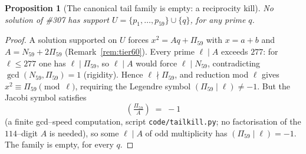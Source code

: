 \documentclass[11pt]{article}
\newtheorem{proposition}[theorem]{Proposition}
\theoremstyle{definition}
\begin{document}
\begin{proposition}[The canonical tail family is empty: a reciprocity kill]\label{prop:tailkill}
No solution of \#307 has support $U=\{p_1,\dots,p_{59}\}\cup\{q\}$, for any prime $q$.
\end{proposition}
\begin{proof}
A solution supported on $U$ forces $x^2=Aq+\Pi_{59}$ with $x=a+b$ and $A=N_{59}+2\Pi_{59}$
(Remark~\ref{rem:tier60}). Every prime $\ell\mid A$ exceeds $277$: for $\ell\le277$ one has
$\ell\mid\Pi_{59}$, so $\ell\mid A$ would force $\ell\mid N_{59}$, contradicting
$\gcd(N_{59},\Pi_{59})=1$ (rigidity). Hence $\ell\nmid\Pi_{59}$, and reduction mod $\ell$ gives
$x^2\equiv\Pi_{59}\pmod\ell$, requiring the Legendre symbol $(\Pi_{59}\mid\ell)\neq-1$. But the
Jacobi symbol satisfies
\[ \left(\tfrac{\Pi_{59}}{A}\right)\;=\;-1 \]
(a finite gcd--speed computation, script \texttt{code/tailkill.py}; no factorisation of the
$114$--digit $A$ is needed), so some $\ell\mid A$ of odd multiplicity has $(\Pi_{59}\mid\ell)=-1$.
The family is empty, for every $q$.


\end{proof}
\end{document}

